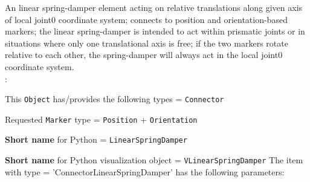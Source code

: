 \ei

%
\newpage


\label{sec:item:ObjectConnectorLinearSpringDamper}
An linear spring-damper element acting on relative translations along given axis of local joint0 coordinate system; connects to position and orientation-based markers; the linear spring-damper is intended to act within prismatic joints or in situations where only one translational axis is free; if the two markers rotate relative to each other, the spring-damper will always act in the local joint0 coordinate system.
\vspace{12pt}\\

\noindent {}:
\bi
  \item This \texttt{Object} has/provides the following types = \texttt{Connector}
  \item Requested \texttt{Marker} type = \texttt{Position} + \texttt{Orientation}
  \item {\bf Short name} for Python = \texttt{LinearSpringDamper}
  \item {\bf Short name} for Python visualization object = \texttt{VLinearSpringDamper}
\ei\vspace{12pt} \noindent 
The item  with type = 'ConnectorLinearSpringDamper' has the following parameters:
\vspace{-0.5cm}\\
\vspace{-0.5cm}\\
